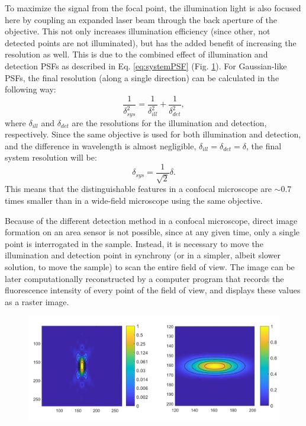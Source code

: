     To maximize the signal from the focal point, the illumination light is also focused here by coupling an expanded laser beam through the back aperture of the objective. This not only increases illumination efficiency (since other, not detected points are not illuminated), but has the added benefit of increasing the resolution as well. This is due to the combined effect of illumination and detection PSFs as described in Eq. \ref{eq:systemPSF} (Fig. \ref{fig:psf-confocal}). For Gaussian-like PSFs, the final resolution (along a single direction) can be calculated in the following way:
    \begin{equation}
      \frac{1}{\delta _{sys}^2} = \frac{1}{\delta _{ill}^2} + \frac{1}{\delta _{det}^2},
      \label{eq:systemRes}
    \end{equation}
    where $\delta_{ill}$ and $\delta_{det}$ are the resolutions for the illumination and detection, respectively. Since the same objective is used for both illumination and detection, and the difference in wavelength is almost negligible, $\delta_{ill} = \delta_{det} = \delta$, the final system resolution will be:
    \begin{equation}
      \delta_{sys} = \frac{1}{\sqrt{2}} \delta.
    \end{equation}
    This means that the distinguishable features in a confocal microscope are $\sim$0.7 times smaller than in a wide-field microscope using the same objective.

    Because of the different detection method in a confocal microscope, direct image formation on an area sensor is not possible, since at any given time, only a single point is interrogated in the sample. Instead, it is necessary to move the illumination and detection point in synchrony (or in a simpler, albeit slower solution, to move the sample) to scan the entire field of view. The image can be later computationally reconstructed by a computer program that records the fluorescence intensity of every point of the field of view, and displays these values as a raster image.


    \begin{figure}
      \centering
      \includegraphics[width=1\textwidth]{psfs/confocal.pdf}
      \label{fig:psf-confocal}
    \end{figure}


